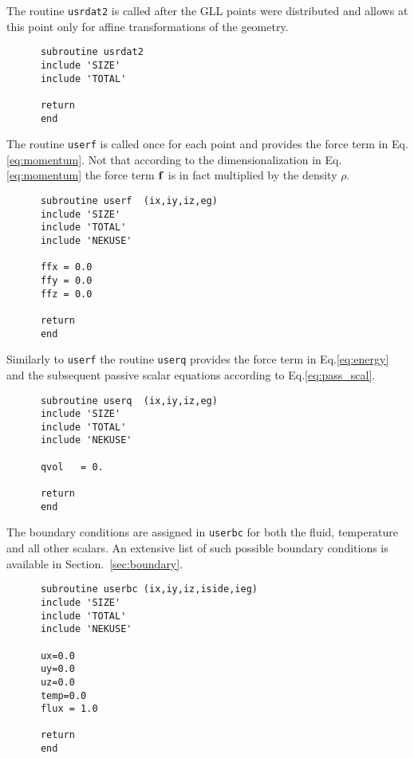 The routine {\tt usrdat2} is called after the GLL points were distributed and allows at this point only for affine transformations of the geometry.
\begin{lstlisting}
      subroutine usrdat2
      include 'SIZE'
      include 'TOTAL'

      return
      end
\end{lstlisting}

The routine {\tt userf} is called once for each point and provides the force term in Eq.\ref{eq:momentum}. Not that according to the dimensionalization in Eq.\ref{eq:momentum} the force term $\mathbf{f}$ is in fact multiplied by the density $\rho$.
\begin{lstlisting}
      subroutine userf  (ix,iy,iz,eg)
      include 'SIZE'
      include 'TOTAL'
      include 'NEKUSE'

      ffx = 0.0
      ffy = 0.0
      ffz = 0.0

      return
      end
\end{lstlisting}

Similarly to {\tt userf} the routine {\tt userq} provides the force term in Eq.\ref{eq:energy} and the subsequent passive scalar equations according to Eq.\ref{eq:pass_scal}.
\begin{lstlisting}	
      subroutine userq  (ix,iy,iz,eg)
      include 'SIZE'
      include 'TOTAL'
      include 'NEKUSE'
      
      qvol   = 0.

      return
      end
      \end{lstlisting}
      
      The boundary conditions are assigned in {\tt userbc} for both the fluid, temperature and all other scalars. An extensive list of such possible boundary conditions is available in Section.~\ref{sec:boundary}. 
      \begin{lstlisting}
      subroutine userbc (ix,iy,iz,iside,ieg)
      include 'SIZE'
      include 'TOTAL'
      include 'NEKUSE'

      ux=0.0
      uy=0.0
      uz=0.0
      temp=0.0
      flux = 1.0
      
      return
      end
\end{lstlisting}

